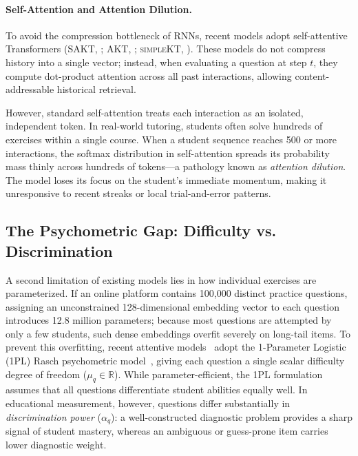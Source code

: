\documentclass[11pt]{article}
\begin{document}
\paragraph{Self-Attention and Attention Dilution.}
To avoid the compression bottleneck of RNNs, recent models adopt self-attentive Transformers (\textsc{SAKT}, \citet{pandey2019self}; \textsc{AKT}, \citet{ghosh2020context}; \textsc{simpleKT}, \citet{liu2023simplekt}). These models do not compress history into a single vector; instead, when evaluating a question at step $t$, they compute dot-product attention across all past interactions, allowing content-addressable historical retrieval.

However, standard self-attention treats each interaction as an isolated, independent token. In real-world tutoring, students often solve hundreds of exercises within a single course. When a student sequence reaches 500 or more interactions, the softmax distribution in self-attention spreads its probability mass thinly across hundreds of tokens—a pathology known as \emph{attention dilution}. The model loses its focus on the student's immediate momentum, making it unresponsive to recent streaks or local trial-and-error patterns.

\subsection{The Psychometric Gap: Difficulty vs. Discrimination}

A second limitation of existing models lies in how individual exercises are parameterized. If an online platform contains 100,000 distinct practice questions, assigning an unconstrained 128-dimensional embedding vector to each question introduces 12.8 million parameters; because most questions are attempted by only a few students, such dense embeddings overfit severely on long-tail items. To prevent this overfitting, recent attentive models~\citep{ghosh2020context} adopt the 1-Parameter Logistic (1PL) Rasch psychometric model~\citep{rasch1960probabilistic}, giving each question a single scalar difficulty degree of freedom ($\mu_q \in \mathbb{R}$). While parameter-efficient, the 1PL formulation assumes that all questions differentiate student abilities equally well. In educational measurement, however, questions differ substantially in \emph{discrimination power} ($\alpha_q$): a well-constructed diagnostic problem provides a sharp signal of student mastery, whereas an ambiguous or guess-prone item carries lower diagnostic weight.
\end{document}
